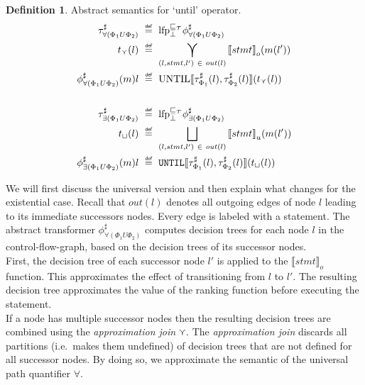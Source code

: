 \documentclass[11pt,a4paper,titlepage]{article}
\theoremstyle{definition}
\newtheorem{definition}{Definition}[section]
\newcommand\eqdef{\mathrel{\overset{\makebox[0pt]{\mbox{\normalfont\tiny\sffamily def}}}{=}}}
\begin{document}
\begin{definition}\label{def:abstract_until_semantics}
    Abstract semantics for `until' operator.
    \setlength{\jot}{15pt}
    \begin{align*}
        \tau^\sharp_{\forall(\Phi_1 U \Phi_2)} \ &\eqdef \ \text{lfp}^{\sqsubseteq_{\mathcal{T}}}_{\bot} \phi^\sharp_{\forall(\Phi_1 U \Phi_2)}\\
        t_{\curlyvee}(l)  \ &\eqdef \ \bigcurlyvee\limits_{(l, stmt, l') \ \in \ out(l) } {\llbracket stmt \rrbracket}_{o} ( m(l')) \\
        \phi^\sharp_{\forall(\Phi_1 U \Phi_2)}(m)l \ &\eqdef \ \text{UNTIL}\llbracket \tau^\sharp_{\Phi_1}(l), \tau^\sharp_{\Phi_2}(l) \rrbracket (t_{\curlyvee}(l))  \\\\
        \tau^\sharp_{\exists(\Phi_1 U \Phi_2)} \ &\eqdef \ \text{lfp}^{\sqsubseteq_{\mathcal{T}}}_{\bot} \phi^\sharp_{\exists(\Phi_1 U \Phi_2)}\\
        t_{\sqcup}(l) \ &\eqdef \ \bigsqcup\limits_{(l, stmt, l') \ \in \ out(l) } {\llbracket stmt \rrbracket}_{u} (m(l')) \\
        \phi^\sharp_{\exists(\Phi_1 U \Phi_2)}(m)l \ &\eqdef \ \mathtt{UNTIL}\llbracket \tau^\sharp_{\Phi_1}(l), \tau^\sharp_{\Phi_2}(l) \rrbracket ( t_{\sqcup}(l))
    \end{align*}
\end{definition}

We will first discuss the universal version and then explain what changes for the existential case.
Recall that $out(l)$ denotes all outgoing edges of node $l$ leading to its immediate successors nodes. Every edge is labeled with a statement. 
The abstract transformer $\phi^\sharp_{\forall(\Phi_1 U \Phi_2)}$ computes decision trees for each node $l$ in the 
control-flow-graph, based on the decision trees of its successor nodes.\\

First, the decision tree of each successor node $l'$ is applied to the ${\llbracket stmt \rrbracket}_{o}$ function. 
This approximates the effect of transitioning from $l$ to $l'$. The resulting decision tree approximates the value of 
the ranking function before executing the statement.\\

If a node has multiple successor nodes then the resulting decision trees 
are combined using the \textit{approximation join} $\curlyvee$. The \textit{approximation join} discards all partitions (i.e.\ makes them undefined)
of decision trees that are not defined for all successor nodes. By doing so, we approximate the semantic of the universal path  
quantifier $\forall$.\\ 
\end{document}
